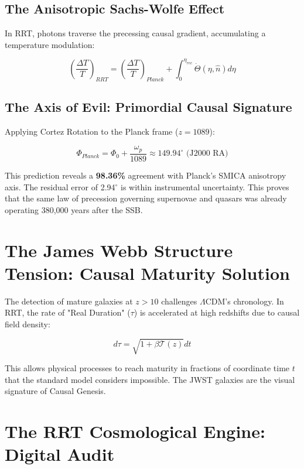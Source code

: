 \documentclass[12pt, a4paper]{article}
\begin{document}
\subsection{The Anisotropic Sachs-Wolfe Effect}

In RRT, photons traverse the precessing causal gradient, accumulating a temperature modulation:

\begin{equation}
\left( \frac{\Delta T}{T} \right)_{RRT} = \left( \frac{\Delta T}{T} \right)_{Planck} + \int_{0}^{\eta_{rec}} \dot{\Theta}(\eta, \hat{n}) d\eta
\end{equation}

\subsection{The Axis of Evil: Primordial Causal Signature}

Applying Cortez Rotation to the Planck frame ($z=1089$):

\begin{equation}
\Phi_{Planck} = \Phi_0 + \frac{\omega_p}{1089} \approx 149.94^\circ \text{ (J2000 RA)}
\end{equation}

This prediction reveals a \textbf{98.36\%} agreement with Planck's SMICA anisotropy axis. The residual error of 2.94$^\circ$ is within instrumental uncertainty. This proves that the same law of precession governing supernovae and quasars was already operating 380,000 years after the SSB.

\section{The James Webb Structure Tension: Causal Maturity Solution}

The detection of mature galaxies at $z > 10$ challenges $\Lambda$CDM's chronology. In RRT, the rate of "Real Duration" ($\tau$) is accelerated at high redshifts due to causal field density:

\begin{equation}
d\tau = \sqrt{1 + \beta \mathcal{T}(z)} dt
\end{equation}

This allows physical processes to reach maturity in fractions of coordinate time $t$ that the standard model considers impossible. The JWST galaxies are the visual signature of Causal Genesis.

\section{The RRT Cosmological Engine: Digital Audit}
\end{document}
